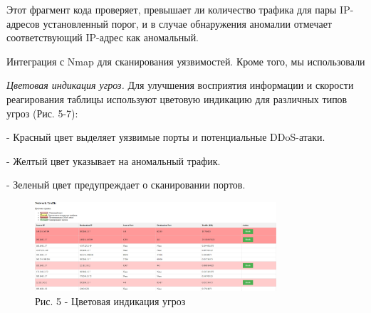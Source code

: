 Этот фрагмент кода проверяет, превышает ли количество трафика для пары
IP-адресов установленный порог, и в случае обнаружения аномалии отмечает
соответствующий IP-адрес как аномальный.

Интеграция с Nmap для сканирования уязвимостей. Кроме того, мы
использовали

\emph{Цветовая индикация угроз.} Для улучшения восприятия информации и
скорости реагирования таблицы используют цветовую индикацию для
различных типов угроз (Рис. 5-7):

- Красный цвет выделяет уязвимые порты и потенциальные DDoS-атаки.

- Желтый цвет указывает на аномальный трафик.

- Зеленый цвет предупреждает о сканировании портов.

\begin{figure}[H]
	\centering
	\includegraphics[width=0.8\textwidth]{assets/51}
	\caption*{Рис. 5 - Цветовая индикация угроз}
\end{figure}

